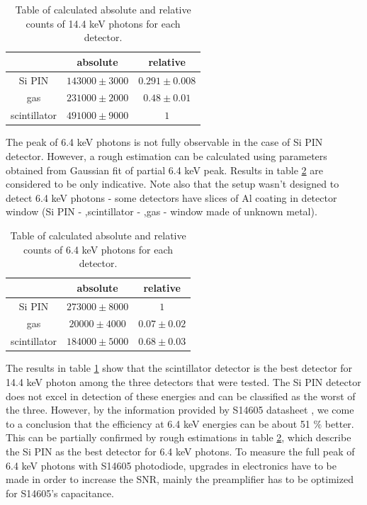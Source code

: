 \begin{table}[H]
\centering
\begin{tabular}{|c|c|c|}
\hline
   & absolute & relative \\ \hline
Si PIN & $143000 \pm 3000$    & $0.291 \pm 0.008$  \\ \hline
gas & $231000 \pm 2000$    & $0.48 \pm  0.01$ \\ \hline
scintillator  & $491000 \pm 9000$    & $1$ \\ \hline
\end{tabular}
\caption{Table of calculated absolute and relative counts of 14.4 keV photons for each detector.}
 \label{144kevEFF}
\end{table}


The peak of 6.4 keV photons is not fully observable in the case of Si PIN detector. However, a rough estimation can be calculated using parameters obtained from Gaussian fit of partial 6.4 keV peak. Results in table \ref{64kevEFF} are considered to be only indicative. Note also that the setup wasn't designed to detect 6.4 keV photons - some detectors have slices of Al coating in detector window (Si PIN - ,scintillator - ,gas - window made of unknown metal).  

\begin{table}[H]
\centering
\begin{tabular}{|c|c|c|}
\hline
   & absolute & relative \\ \hline
Si PIN & $273000 \pm 8000$    & $1$  \\ \hline
gas & $20000 \pm 4000$    & $0.07 \pm 0.02$ \\ \hline
scintillator  & $184000 \pm 5000$    & $0.68 \pm 0.03$ \\ \hline
\end{tabular}
\caption{Table of calculated absolute and relative counts of 6.4 keV photons for each detector.}
 \label{64kevEFF}
\end{table}


\par
The results in table \ref{144kevEFF} show that the scintillator detector is the best detector for 14.4 keV photon among the three detectors that were tested. The Si PIN detector does not excel in detection of these energies and can be classified as the worst of the three. However, by the information provided by S14605 datasheet \cite{datS14605}, we come to a conclusion that the efficiency at 6.4 keV energies can be about 51 $\%$ better. This can be partially confirmed by rough estimations in table \ref{64kevEFF}, which describe the Si PIN as the best detector for 6.4 keV photons. To measure the full peak of 6.4 keV photons with S14605 photodiode, upgrades in electronics have to be made in order to increase the SNR, mainly the preamplifier has to be optimized for S14605's capacitance.



